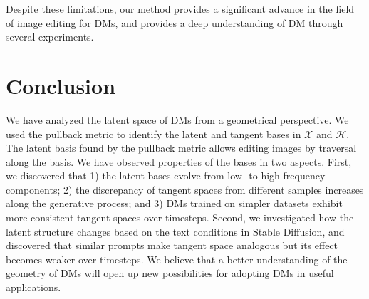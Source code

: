 



Despite these limitations, our method provides a significant advance in the field of image editing for DMs, and provides a deep understanding of DM through several experiments.

\section{Conclusion}
\vspace{-0.5em}
We have analyzed the latent space of DMs from a geometrical perspective. 
We used the pullback metric to identify the latent and tangent bases in $\mathcal{X}$ and $\mathcal{H}$. 
The latent basis found by the pullback metric allows editing images by traversal along the basis.
We have observed properties of the bases in two aspects.
First, we discovered that 1) the latent bases evolve from low- to high-frequency components; 2) the discrepancy of tangent spaces from different samples increases along the generative process; and 3) DMs trained on simpler datasets exhibit more consistent tangent spaces over timesteps.
Second, we investigated how the latent structure changes based on the text conditions in Stable Diffusion, and discovered that similar prompts make tangent space analogous but its effect becomes weaker over timesteps.
We believe that a better understanding of the geometry of DMs will open up new possibilities for adopting DMs in useful applications.

